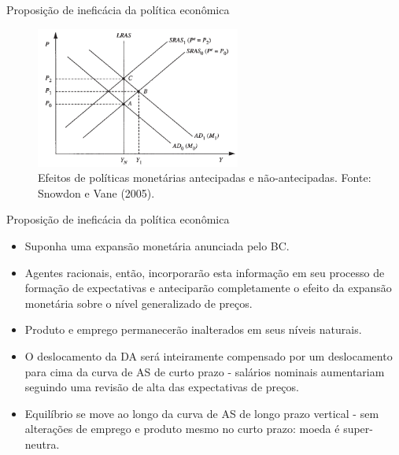 \documentclass[10pt]{beamer}
\begin{document}
\begin{frame}{Proposição de ineficácia da política econômica}
    \begin{figure}
        \centering
        \includegraphics[width=0.6\textwidth]{./figures/aula12_fig1.PNG}
        \caption{Efeitos de políticas monetárias antecipadas e não-antecipadas. Fonte: Snowdon e Vane (2005).}
        \label{fig1}
    \end{figure}
\end{frame}

\begin{frame}{Proposição de ineficácia da política econômica}
    \begin{itemize}
        \item Suponha uma expansão monetária anunciada pelo BC.
        \bigskip
        \item Agentes racionais, então, incorporarão esta informação em seu processo de formação de expectativas e anteciparão completamente o efeito da expansão monetária sobre o nível generalizado de preços.
        \bigskip
        \item Produto e emprego permanecerão inalterados em seus níveis naturais.
        \bigskip
        \item O deslocamento da DA será inteiramente compensado por um deslocamento para cima da curva de AS de curto prazo - salários nominais aumentariam seguindo uma revisão de alta das expectativas de preços.
        \bigskip
        \item Equilíbrio se move ao longo da curva de AS de longo prazo vertical - sem alterações de emprego e produto mesmo no curto prazo: moeda é super-neutra.
    \end{itemize}
\end{frame}
\end{document}

